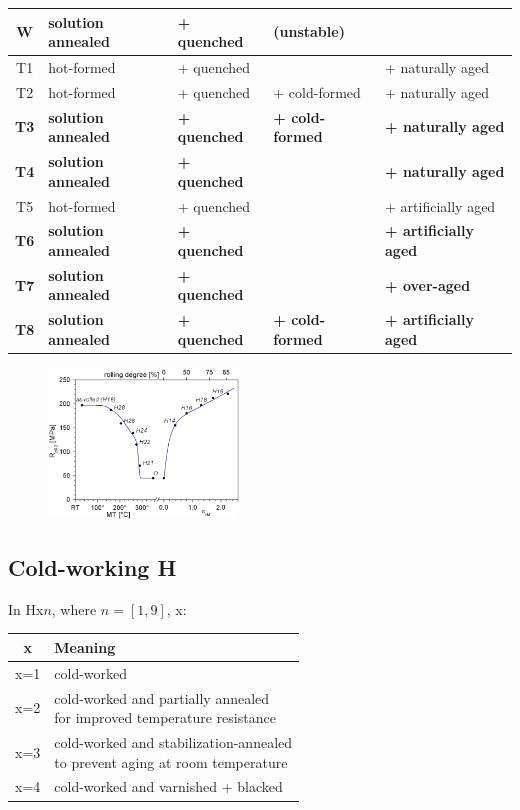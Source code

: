 \documentclass{article}
\begin{document}
\begin{table}[ht!]
  \centering
  \begin{tabular}{|c|l|l|l|l|}
    \hline W & solution annealed & + quenched & (unstable) & \\
    \hline T1 & hot-formed & + quenched & & + naturally aged\\
    \hline T2 & hot-formed & + quenched & + cold-formed & + naturally aged\\
    \hline \textbf{T3} & \textbf{solution annealed} & \textbf{+ quenched} & \textbf{+ cold-formed} & \textbf{+ naturally aged}\\
    \hline \textbf{T4} & \textbf{solution annealed} & \textbf{+ quenched} & & \textbf{+ naturally aged}\\
    \hline T5 & hot-formed & + quenched & & + artificially aged\\
    \hline \textbf{T6} & \textbf{solution annealed} & \textbf{+ quenched} & & \textbf{+ artificially aged}\\
    \hline \textbf{T7} & \textbf{solution annealed} & \textbf{+ quenched} & & \textbf{+ over-aged}\\
    \hline \textbf{T8} & \textbf{solution annealed} & \textbf{+ quenched} & \textbf{+ cold-formed} & \textbf{+ artificially aged}\\
    \hline
  \end{tabular}
\end{table}

\begin{figure}
  \includegraphics[width=0.45\textwidth]{media/cold-working.png}
\end{figure}

\phantom{}

\subsection{Cold-working H}
In Hx$n$, where $n=[1,9]$, x:

\begin{tabular}{|c|l|}
  \hline \textbf{x} & \textbf{Meaning}\\
  \hline x=1 & cold-worked\\
  \hline x=2 & \makecell[l]{cold-worked and partially annealed\\for improved temperature resistance}\\
  \hline x=3 & \makecell[l]{cold-worked and stabilization-annealed\\to prevent aging at room temperature}\\
  \hline x=4 & cold-worked and varnished + blacked\\
  \hline 
\end{tabular}
\wrapfill
\vspace*{-10cm}
\end{document}
